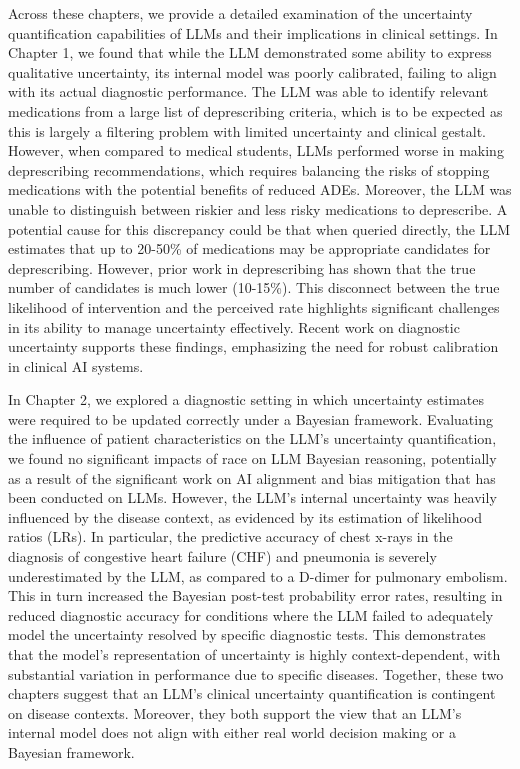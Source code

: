 Across these chapters, we provide a detailed examination of the uncertainty quantification capabilities of LLMs and their implications in clinical settings. In Chapter 1, we found that while the LLM demonstrated some ability to express qualitative uncertainty, its internal model was poorly calibrated, failing to align with its actual diagnostic performance. The LLM was able to identify relevant medications from a large list of deprescribing criteria, which is to be expected as this is largely a filtering problem with limited uncertainty and clinical gestalt. However, when compared to medical students, LLMs performed worse in making deprescribing recommendations, which requires balancing the risks of stopping medications with the potential benefits of reduced ADEs. Moreover, the LLM was unable to distinguish between riskier and less risky medications to deprescribe. A potential cause for this discrepancy could be that when queried directly, the LLM estimates that up to 20-50\% of medications may be appropriate candidates for deprescribing. However, prior work in deprescribing has shown that the true number of candidates is much lower (10-15\%)\citep{scottReducingInappropriatePolypharmacy2015}. This disconnect between the true likelihood of intervention and the perceived rate highlights significant challenges in its ability to manage uncertainty effectively. Recent work on diagnostic uncertainty supports these findings\citep{huangFutureAIClinicians2024}, emphasizing the need for robust calibration in clinical AI systems.

In Chapter 2, we explored a diagnostic setting in which uncertainty estimates were required to be updated correctly under a Bayesian framework. Evaluating the influence of patient characteristics on the LLM's uncertainty quantification, we found no significant impacts of race on LLM Bayesian reasoning, potentially as a result of the significant work on AI alignment and bias mitigation that has been conducted on LLMs\citep{gallegosBiasFairnessLarge2024}. However, the LLM's internal uncertainty was heavily influenced by the disease context, as evidenced by its estimation of likelihood ratios (LRs). In particular, the predictive accuracy of chest x-rays in the diagnosis of congestive heart failure (CHF) and pneumonia is severely underestimated by the LLM, as compared to a D-dimer for pulmonary embolism. This in turn increased the Bayesian post-test probability error rates, resulting in reduced diagnostic accuracy for conditions where the LLM failed to adequately model the uncertainty resolved by specific diagnostic tests. This demonstrates that the model’s representation of uncertainty is highly context-dependent, with substantial variation in performance due to specific diseases. Together, these two chapters suggest that an LLM's clinical uncertainty quantification is contingent on disease contexts. Moreover, they both support the view that an LLM's internal model does not align with either real world decision making or a Bayesian framework.
 
